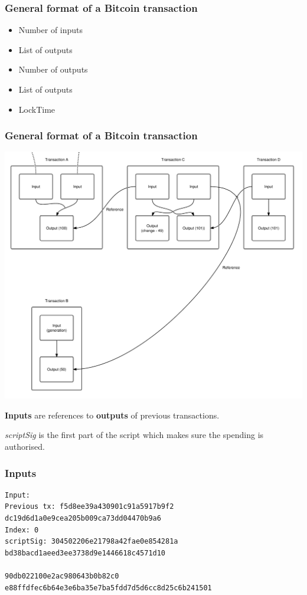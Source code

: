 \documentclass{beamer}
\begin{document}
\begin{frame}
\frametitle{General format of a Bitcoin transaction}
\begin{itemize}
\item Number of inputs
\item List of outputs
\item Number of outputs
\item List of outputs
\item LockTime
\end{itemize}
\end{frame}
\begin{frame}
\frametitle{General format of a Bitcoin transaction}
\includegraphics[scale=0.2]{images/transactions.png}
\end{frame}

\begin{frame}[fragile]
\textbf{Inputs} are references to \textbf{outputs} of previous transactions.

\textit{scriptSig} is the first part of the script which makes sure the spending is authorised.
\frametitle{Inputs}
\begin{verbatim}Input:
Previous tx: f5d8ee39a430901c91a5917b9f2
dc19d6d1a0e9cea205b009ca73dd04470b9a6
Index: 0
scriptSig: 304502206e21798a42fae0e854281a
bd38bacd1aeed3ee3738d9e1446618c4571d10

90db022100e2ac980643b0b82c0
e88ffdfec6b64e3e6ba35e7ba5fdd7d5d6cc8d25c6b241501
\end{verbatim}
\end{frame}
\end{document}
